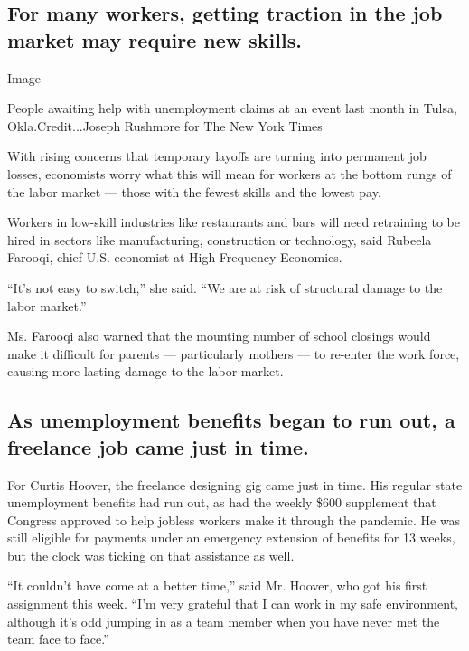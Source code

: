 \hypertarget{for-many-workers-getting-traction-in-the-job-market-may-require-new-skills}{%
\subsection{For many workers, getting traction in the job market may
require new
skills.}\label{for-many-workers-getting-traction-in-the-job-market-may-require-new-skills}}

Image

People awaiting help with unemployment claims at an event last month in
Tulsa, Okla.Credit...Joseph Rushmore for The New York Times

With rising concerns that temporary layoffs are turning into permanent
job losses, economists worry what this will mean for workers at the
bottom rungs of the labor market --- those with the fewest skills and
the lowest pay.

Workers in low-skill industries like restaurants and bars will need
retraining to be hired in sectors like manufacturing, construction or
technology, said Rubeela Farooqi, chief U.S. economist at High Frequency
Economics.

``It's not easy to switch,'' she said. ``We are at risk of structural
damage to the labor market.''

Ms. Farooqi also warned that the mounting number of school closings
would make it difficult for parents --- particularly mothers --- to
re-enter the work force, causing more lasting damage to the labor
market.

\hypertarget{as-unemployment-benefits-began-to-run-out-a-freelance-job-came-just-in-time}{%
\subsection{As unemployment benefits began to run out, a freelance job
came just in
time.}\label{as-unemployment-benefits-began-to-run-out-a-freelance-job-came-just-in-time}}

For Curtis Hoover, the freelance designing gig came just in time. His
regular state unemployment benefits had run out, as had the weekly \$600
supplement that Congress approved to help jobless workers make it
through the pandemic. He was still eligible for payments under an
emergency extension of benefits for 13 weeks, but the clock was ticking
on that assistance as well.

``It couldn't have come at a better time,'' said Mr. Hoover, who got his
first assignment this week. ``I'm very grateful that I can work in my
safe environment, although it's odd jumping in as a team member when you
have never met the team face to face.''

